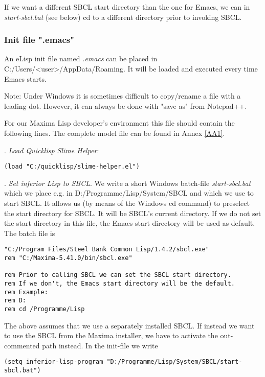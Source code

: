 \documentclass[../Maxima_Workbook.tex]{subfiles}
\begin{document}
If we want a different SBCL start directory than the one for Emacs, we can in \emph{start-sbcl.bat} (see below) cd to a different directory prior to invoking SBCL.

\subsubsection{Init file ".emacs"}\label{EE1}

An eLisp init file named \emph{.emacs} can be placed in C:/Users/<user>/AppData/Roaming. It will be loaded and executed every time Emacs starts.

\lz Note: Under Windows it is sometimes difficult to copy/rename a file with a leading dot. However, it can always be done with "save as" from Notepad++.

\lz For our Maxima Lisp developer's environment this file should contain the following lines. The complete model file can be found in Annex \ref{AA1}.

. \emph{Load Quicklisp Slime Helper}:
\begin{lstlisting}[style=lisp]
(load "C:/quicklisp/slime-helper.el")
\end{lstlisting}

. \emph{Set inferior Lisp to SBCL}. We write a short Windows batch-file \emph{start-sbcl.bat} which we place e.g. in D:/Programme/Lisp/System/SBCL and which we use to start SBCL. It allows us (by means of the Windows cd command) to preselect the start directory for SBCL. It will be SBCL's current directory. If we do not set the start directory in this file, the Emacs start directory will be used as default. The batch file is

\begin{lstlisting}[style=smallblue]
"C:/Program Files/Steel Bank Common Lisp/1.4.2/sbcl.exe"
rem "C:/Maxima-5.41.0/bin/sbcl.exe"

rem Prior to calling SBCL we can set the SBCL start directory.
rem If we don't, the Emacs start directory will be the default.
rem Example:
rem D:
rem cd /Programme/Lisp
\end{lstlisting}

\lz The above assumes that we use a separately installed SBCL. If instead we want to use the SBCL from the Maxima installer, we have to activate the out-commented path instead. In the init-file we write

\begin{lstlisting}[style=lisp]
(setq inferior-lisp-program "D:/Programme/Lisp/System/SBCL/start-sbcl.bat")
\end{lstlisting}
\end{document}
